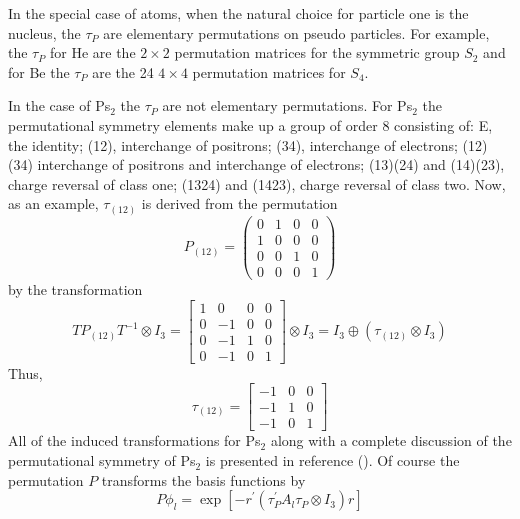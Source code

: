 \documentclass[12pt,thmsa]{article}
\begin{document}
In the special case of atoms, when the natural choice for particle one is
the nucleus, the $\tau _P$ are elementary permutations on pseudo particles.
For example, the $\tau _P$ for He are the $2\times 2$ permutation matrices
for the symmetric group $S_2$ and for Be the $\tau _P$ are the 24 $4\times 4$
permutation matrices for $S_4$.

In the case of Ps$_2$ the $\tau _P$ are not elementary permutations. For Ps$%
_2$ the permutational symmetry elements make up a group of order 8
consisting of: E, the identity; (12), interchange of positrons; (34),
interchange of electrons; (12)(34) interchange of positrons and interchange
of electrons; (13)(24) and (14)(23), charge reversal of class one; (1324)
and (1423), charge reversal of class two. Now, as an example, $\tau _{(12)}$
is derived from the permutation 
\begin{equation}
P_{(12)}=\left( 
\begin{array}{cccc}
0 & 1 & 0 & 0 \\ 
1 & 0 & 0 & 0 \\ 
0 & 0 & 1 & 0 \\ 
0 & 0 & 0 & 1
\end{array}
\right)
\end{equation}
by the transformation 
\begin{equation}
TP_{\left( 12\right) }T^{-1}\otimes I_3=\left[ 
\begin{array}{cccc}
1 & 0 & 0 & 0 \\ 
0 & -1 & 0 & 0 \\ 
0 & -1 & 1 & 0 \\ 
0 & -1 & 0 & 1
\end{array}
\right] \otimes I_3=I_3\oplus \left( \tau _{\left( 12\right) }\otimes
I_3\right)
\end{equation}
Thus, 
\begin{equation}
\tau _{\left( 12\right) }=\left[ 
\begin{array}{ccc}
-1 & 0 & 0 \\ 
-1 & 1 & 0 \\ 
-1 & 0 & 1
\end{array}
\right]
\end{equation}
All of the induced transformations for Ps$_2$ along with a complete
discussion of the permutational symmetry of Ps$_2$ is presented in reference
(\cite{Kinghorn93}). Of course the permutation $P$ transforms the basis
functions by 
\begin{equation}
P\phi _l=\exp \left[ -r^{\prime }\left( \tau _P^{\prime }A_l\tau _P\otimes
I_3\right) r\right]
\end{equation}
\end{document}
